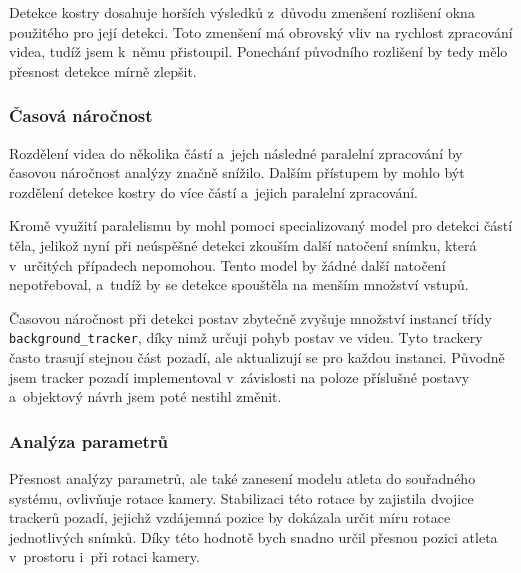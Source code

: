 Detekce kostry dosahuje horších výsledků z~důvodu zmenšení rozlišení okna použitého pro její detekci. Toto zmenšení má obrovský vliv na rychlost zpracování videa, tudíž jsem k~němu přistoupil. Ponechání původního rozlišení by tedy mělo přesnost detekce mírně zlepšit.


\subsubsection{Časová náročnost}

Rozdělení videa do několika částí a~jejch následné paralelní zpracování by časovou náročnost analýzy značně snížilo. Dalším přístupem by mohlo být rozdělení detekce kostry do více částí a~jejich paralelní zpracování.

Kromě využití paralelismu by mohl pomoci specializovaný model pro detekci částí těla, jelikož nyní při neúspěšné detekci zkouším další natočení snímku, která v~určitých případech nepomohou. Tento model by žádné další natočení nepotřeboval, a~tudíž by se detekce spouštěla na menším množství vstupů.

Časovou náročnost při detekci postav zbytečně zvyšuje množství instancí třídy \texttt{background\_tracker}, díky nimž určuji pohyb postav ve videu. Tyto trackery často trasují stejnou část pozadí, ale aktualizují se pro každou instanci. Původně jsem tracker pozadí implementoval v~závislosti na poloze příslušné postavy a~objektový návrh jsem poté nestihl změnit.


\subsubsection{Analýza parametrů}

Přesnost analýzy parametrů, ale také zanesení modelu atleta do souřadného systému, ovlivňuje rotace kamery. Stabilizaci této rotace by zajistila dvojice trackerů pozadí, jejichž vzdájemná pozice by dokázala určit míru rotace jednotlivých snímků. Díky této hodnotě bych snadno určil přesnou pozici atleta v~prostoru i~při rotaci kamery.
